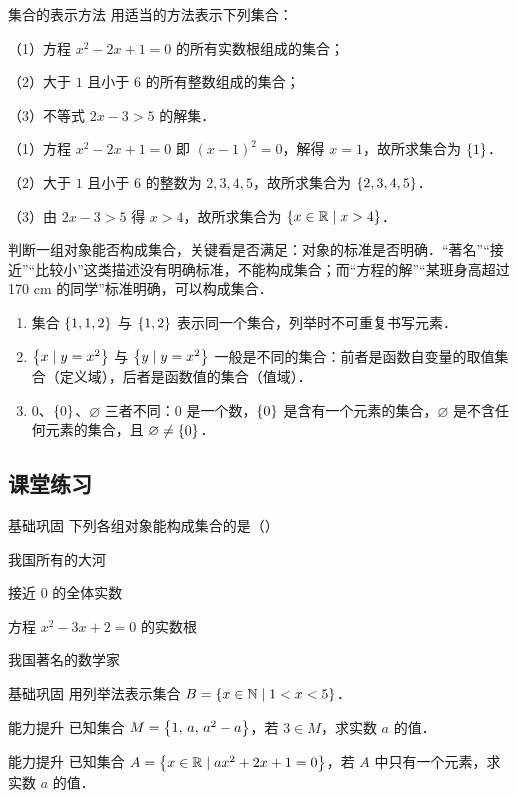 \begin{example}{集合的表示方法}
用适当的方法表示下列集合：

（1）方程 $x^{2}-2x+1=0$ 的所有实数根组成的集合；

（2）大于 $1$ 且小于 $6$ 的所有整数组成的集合；

（3）不等式 $2x-3>5$ 的解集．

\begin{solution}
（1）方程 $x^{2}-2x+1=0$ 即 $(x-1)^{2}=0$，解得 $x=1$，故所求集合为 $\left\{ 1 \right\}$．

（2）大于 $1$ 且小于 $6$ 的整数为 $2,3,4,5$，故所求集合为 $\left\{ 2,3,4,5 \right\}$．

（3）由 $2x-3>5$ 得 $x>4$，故所求集合为 $\left\{ x\in\mathbb{R} \mid x>4 \right\}$．
\end{solution}
\end{example}

\begin{method}[判断能否构成集合]
判断一组对象能否构成集合，关键看是否满足：对象的标准是否明确．“著名”“接近”“比较小”这类描述没有明确标准，不能构成集合；而“方程的解”“某班身高超过 170 cm 的同学”标准明确，可以构成集合．
\end{method}

\begin{note}[三个易错点]
\begin{enumerate}
  \item 集合 $\left\{ 1,1,2 \right\}$ 与 $\left\{ 1,2 \right\}$ 表示同一个集合，列举时不可重复书写元素．
  \item $\left\{ x \mid y=x^{2} \right\}$ 与 $\left\{ y \mid y=x^{2} \right\}$ 一般是不同的集合：前者是函数自变量的取值集合（定义域），后者是函数值的集合（值域）．
  \item $0$、$\left\{ 0 \right\}$、$\varnothing$ 三者不同：$0$ 是一个数，$\left\{ 0 \right\}$ 是含有一个元素的集合，$\varnothing$ 是不含任何元素的集合，且 $\varnothing\ne\left\{ 0 \right\}$．
\end{enumerate}
\end{note}

\subsection{课堂练习}

\begin{exercise}{基础巩固}
下列各组对象能构成集合的是（\quad）

\begin{choices}
  \item 我国所有的大河
  \item 接近 $0$ 的全体实数
  \item 方程 $x^{2}-3x+2=0$ 的实数根
  \item 我国著名的数学家
\end{choices}
\end{exercise}

\begin{exercise}{基础巩固}
用列举法表示集合 $B=\left\{ x\in\mathbb{N} \mid 1<x<5 \right\}$．
\end{exercise}

\begin{exercise}{能力提升}
已知集合 $M=\left\{ 1,\,a,\,a^{2}-a \right\}$，若 $3\in M$，求实数 $a$ 的值．
\end{exercise}

\begin{exercise}{能力提升}
已知集合 $A=\left\{ x\in\mathbb{R} \mid ax^{2}+2x+1=0 \right\}$，若 $A$ 中只有一个元素，求实数 $a$ 的值．
\end{exercise}
